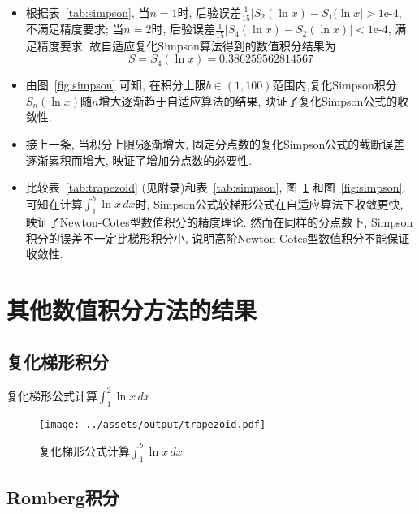 \documentclass{nedsart}
\begin{document}
\begin{itemize}
    \item 根据表~\ref{tab:simpson}, 当$n = 1$时, 后验误差$\frac{1}{15}|S_2(\ln{x})-S_1(\ln{x}| > \text{1e-4}$, 不满足精度要求; 当$n = 2$时, 后验误差$\frac{1}{15}|S_4(\ln{x})-S_2(\ln{x})| < \text{1e-4}$, 满足精度要求. 故自适应复化Simpson算法得到的数值积分结果为
    $$S=S_4(\ln{x})=\text{0.386259562814567}$$ 
    \item 由图~\ref{fig:simpson} 可知, 在积分上限$b \in (1, 100)$范围内,复化Simpson积分$S_n(\ln{x})$随$n$增大逐渐趋于自适应算法的结果, 映证了复化Simpson公式的收敛性.
    \item 接上一条, 当积分上限$b$逐渐增大, 固定分点数的复化Simpson公式的截断误差逐渐累积而增大, 映证了增加分点数的必要性. 
    \item 比较表~\ref{tab:trapezoid} (见附录)和表~\ref{tab:simpson}, 图~\ref{fig:trapezoid} 和图~\ref{fig:simpson}, 可知在计算$\int_1^b \ln{x} \,dx$时, Simpson公式较梯形公式在自适应算法下收敛更快, 映证了Newton-Cotes型数值积分的精度理论. 然而在同样的分点数下, Simpson积分的误差不一定比梯形积分小, 说明高阶Newton-Cotes型数值积分不能保证收敛性.
\end{itemize}

\setupappendix

\section{其他数值积分方法的结果}

\subsection{复化梯形积分}

\begin{table}[H]
    \centering
    \caption{复化梯形公式计算$\int_1^2 \ln{x} \,dx$}
    \label{tab:trapezoid}
\end{table}

\begin{figure}[H]
    \centering
    \texttt{[image: ../assets/output/trapezoid.pdf]}
    \caption{复化梯形公式计算$\int_1^b \ln{x} \,dx$}
    \label{fig:trapezoid}
\end{figure}

\subsection{Romberg积分}
\end{document}
